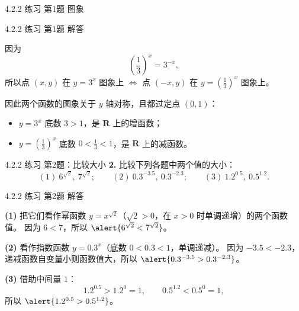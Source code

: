 \documentclass[10pt,aspectratio=169,serif]{ctexbeamer}
\begin{document}
\begin{frame}[t]{4.2.2 练习 第1题 图象}
\begin{center}
\end{center}
\end{frame}

\begin{frame}[t]{4.2.2 练习 第1题 解答}
\begin{tcolorbox}[colback=orange!10,colframe=orange,title=\textbf{解}]
因为
\[
\left(\frac{1}{3}\right)^{x}=3^{-x},
\]
所以点 $(x,y)$ 在 $y=3^{x}$ 图象上 $\Longleftrightarrow$ 点 $(-x,y)$ 在 $y=\left(\frac{1}{3}\right)^{x}$ 图象上。

\vspace{0.4em}
因此两个函数的图象\alert{关于 $y$ 轴对称}，且都过定点 $(0,1)$：
\begin{itemize}
  \item $y=3^{x}$ 底数 $3>1$，是 $\mathbf{R}$ 上的增函数；
  \item $y=\left(\frac{1}{3}\right)^{x}$ 底数 $0<\frac{1}{3}<1$，是 $\mathbf{R}$ 上的减函数。
\end{itemize}
\end{tcolorbox}
\end{frame}

\begin{frame}[t]{4.2.2 练习 第2题：比较大小}
\textbf{2.} 比较下列各题中两个值的大小：
\[
(1)\ 6^{\sqrt{2}},\ 7^{\sqrt{2}};\qquad
(2)\ 0.3^{-3.5},\ 0.3^{-2.3};\qquad
(3)\ 1.2^{0.5},\ 0.5^{1.2}.
\]
\end{frame}

\begin{frame}[t]{4.2.2 练习 第2题 解答}
\begin{tcolorbox}[colback=orange!10,colframe=orange,title=\textbf{解}]
\textbf{(1)} 把它们看作幂函数 $y=x^{\sqrt{2}}$（$\sqrt{2}>0$，在 $x>0$ 时单调递增）的两个函数值。
因为 $6<7$，所以 $\alert{6^{\sqrt2}<7^{\sqrt2}}$。

\vspace{0.5em}
\textbf{(2)} 看作指数函数 $y=0.3^{x}$（底数 $0<0.3<1$，单调递减）。
因为 $-3.5<-2.3$，递减函数自变量小则函数值大，所以 $\alert{0.3^{-3.5}>0.3^{-2.3}}$。

\vspace{0.5em}
\textbf{(3)} 借助中间量 $1$：
\[
1.2^{0.5}>1.2^{0}=1,\qquad 0.5^{1.2}<0.5^{0}=1,
\]
所以 $\alert{1.2^{0.5}>0.5^{1.2}}$。
\end{tcolorbox}
\end{frame}
\end{document}
